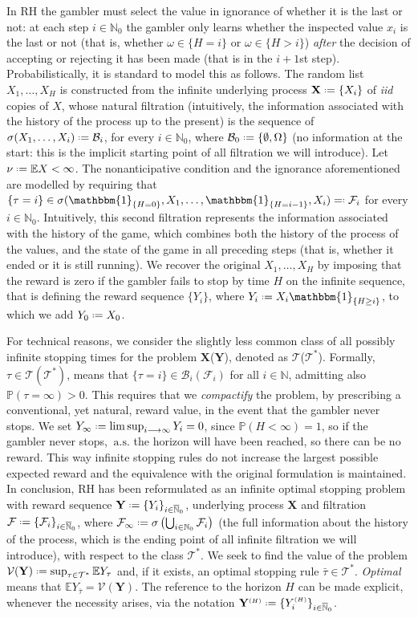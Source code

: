 \documentclass[11pt, a4paper, twoside]{article}
\newcommand*{\defeq}{\mathrel{\vcenter{\baselineskip0.5ex \lineskiplimit0pt
			\hbox{\scriptsize.}\hbox{\scriptsize.}}}=}
\newcommand*{\eqdef}{=\mathrel{\vcenter{\baselineskip0.5ex\lineskiplimit0pt
			\hbox{\scriptsize.}\hbox{\scriptsize.} }}}
\newcommand{\ssup}[1]{{\scriptscriptstyle{({#1})}}}
\newcommand{\NN}{\mathbb{N}}
\newcommand{\NNN}{\overline{\mathbb{N}}}
\newcommand{\EE}{\mathbb{E}}
\newcommand{\PP}{\mathbb{P}}
\newcommand{\TT}{\mathcal{T}}
\newcommand{\FF}{\mathcal{F}}
\newcommand{\Val}{\mathcal{V}}
\newcommand{\YY}{\mathbf{Y}}
\newcommand{\XX}{\mathbf{X}}
\newcommand{\DF}{\mathcal{B}}
\newcommand{\II}{\mathbbm{1}}
\newcommand{\as}{\:\text{a.s.}}
\numberwithin{equation}{section}
\begin{document}
	In RH the gambler must select the value in ignorance of whether it is the last or not: at each step $i\in\NN_0$ the gambler only learns whether the inspected value $x_i$ is the last or not (that is, whether $\omega\in\{H=i\}$ or $\omega\in\{H>i\}$) \textit{after} the decision of accepting or rejecting it has been made (that is in the $i+1$st step). Probabilistically, it is standard to model this as follows. The random list $X_1,\ldots,X_H$ is constructed from the infinite underlying process $\XX\defeq\{X_i\}$ of \textit{iid} copies of $X$, whose natural filtration (intuitively, the information associated with the history of the process up to the present) is the sequence of $\sigma(X_1,\ldots,X_i)\defeq\DF_i$, for every $i\in\NN_0$, where $\DF_0\defeq\{\emptyset,\Omega\}$ (no information at the start: this is the implicit starting point of all filtration we will introduce). Let $\nu\defeq\EE X<\infty$. The nonanticipative condition and the ignorance aforementioned are modelled by requiring that $\{\tau=i\}\in\sigma(\II_{\{H=0\}},X_1,\ldots,\II_{\{H=i-1\}},X_i)\eqdef \FF_i$ for every $i\in\NN_0$. Intuitively, this second filtration represents the information associated with the history of the game, which combines both the history of the process of the values, and the state of the game in all preceding steps (that is, whether it ended or it is still running). We recover the original $X_1,\ldots,X_H$ by imposing that the reward is zero if the gambler fails to stop by time $H$ on the infinite sequence, that is defining the reward sequence $\{Y_i\}$, where $Y_i\defeq X_i\II_{\{H\ge i\}}$, to which we add $Y_0\defeq X_0$.
	
	For technical reasons, we consider the slightly less common class of all possibly infinite stopping times for the problem $\XX$($\YY$), denoted as $\TT$($\TT^*$). Formally, $\tau\in\TT(\TT^*)$, means that $\{\tau=i\}\in\DF_i(\FF_i)$ for all $i\in\NN$, admitting also $\PP(\tau=\infty)> 0$. This requires that we \textit{compactify} the problem, by prescribing a conventional, yet natural, reward value, in the event that the gambler never stops. We set $Y_\infty\defeq \limsup_{i\longrightarrow\infty} Y_i=0$, since $\PP(H<\infty)=1$, so if the gambler never stops, $\as$ the horizon will have been reached, so there can be no reward. This way infinite stopping rules do not increase the largest possible expected reward and the equivalence with the original formulation is maintained. In conclusion, RH has been reformulated as an infinite optimal stopping problem with reward sequence $\YY\defeq\{Y_i\}_{i\in\NNN_0}$, underlying process $\XX$ and filtration $\FF\defeq \{\FF_i\}_{i\in\NNN_0}$, where $\FF_\infty\defeq \sigma\left(\bigcup_{i\in\NN_0} \FF_i\right)$ (the full information about the history of the process, which is the ending point of all infinite filtration we will introduce), with respect to the class $\TT^*$. We seek to find the value of the problem $\Val(\YY)\defeq\sup_{\tau\in\TT^*}\EE Y_\tau$ and, if it exists, an optimal stopping rule $\bar{\tau}\in\TT^*$. \textit{Optimal} means that $\EE Y_{\bar{\tau}} = \Val(\YY)$. The reference to the horizon $H$ can be made explicit, whenever the necessity arises, via the notation $\YY^\ssup{H}\defeq\{Y_i^\ssup{H}\}_{i\in\NNN_0}$.
 
\end{document}
